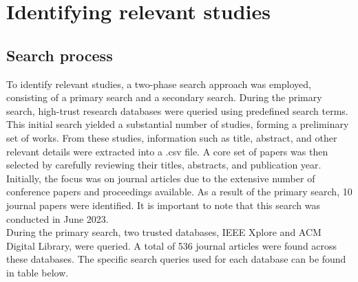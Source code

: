 \documentclass[runningheads]{llncs}
\begin{document}
\section{Identifying relevant studies}
\subsection{Search process}
To identify relevant studies, a two-phase search approach was employed, consisting of a primary search and a secondary search. During the primary search, high-trust research databases were queried using predefined search terms. This initial search yielded a substantial number of studies, forming a preliminary set of works. From these studies, information such as title, abstract, and other relevant details were extracted into a .csv file. A core set of papers was then selected by carefully reviewing their titles, abstracts, and publication year. Initially, the focus was on journal articles due to the extensive number of conference papers and proceedings available. As a result of the primary search, 10 journal papers were identified. It is important to note that this search was conducted in June 2023.
\\
During the primary search, two trusted databases, IEEE Xplore and ACM Digital Library, were queried. A total of 536 journal articles were found across these databases. The specific search queries used for each database can be found in table below.
\end{document}
